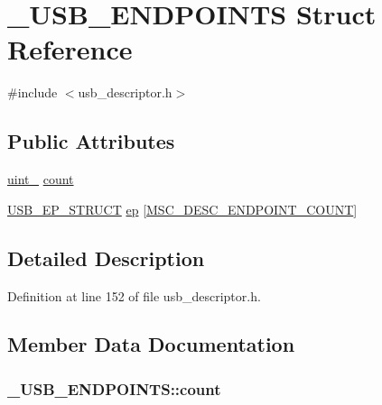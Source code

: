 \hypertarget{struct___u_s_b___e_n_d_p_o_i_n_t_s}{}\section{\+\_\+\+U\+S\+B\+\_\+\+E\+N\+D\+P\+O\+I\+N\+TS Struct Reference}
\label{struct___u_s_b___e_n_d_p_o_i_n_t_s}


{\ttfamily \#include $<$usb\+\_\+descriptor.\+h$>$}

\subsection*{Public Attributes}
\begin{DoxyCompactItemize}
\item 
\hyperlink{types_8h_ad3209046c23f739a81581c10a4be7d92}{uint\+\_} \hyperlink{struct___u_s_b___e_n_d_p_o_i_n_t_s_ab950d1dfa2219c7ed8a22e01add66d2d}{count}
\item 
\hyperlink{usb__devapi_8h_a7b94b615ac1f8864d608ea4465b723fe}{U\+S\+B\+\_\+\+E\+P\+\_\+\+S\+T\+R\+U\+CT} \hyperlink{struct___u_s_b___e_n_d_p_o_i_n_t_s_af7bbbc1e736ecd86e0956db528a112fc}{ep} \mbox{[}\hyperlink{usb__descriptor_8h_a6ed1bc5f91977c790c649aed7e7dce8b}{M\+S\+C\+\_\+\+D\+E\+S\+C\+\_\+\+E\+N\+D\+P\+O\+I\+N\+T\+\_\+\+C\+O\+U\+NT}\mbox{]}
\end{DoxyCompactItemize}


\subsection{Detailed Description}


Definition at line 152 of file usb\+\_\+descriptor.\+h.



\subsection{Member Data Documentation}
\subsubsection[{\texorpdfstring{count}{count}}]{ \+\_\+\+U\+S\+B\+\_\+\+E\+N\+D\+P\+O\+I\+N\+T\+S\+::count}\hypertarget{struct___u_s_b___e_n_d_p_o_i_n_t_s_ab950d1dfa2219c7ed8a22e01add66d2d}{}\label{struct___u_s_b___e_n_d_p_o_i_n_t_s_ab950d1dfa2219c7ed8a22e01add66d2d}


